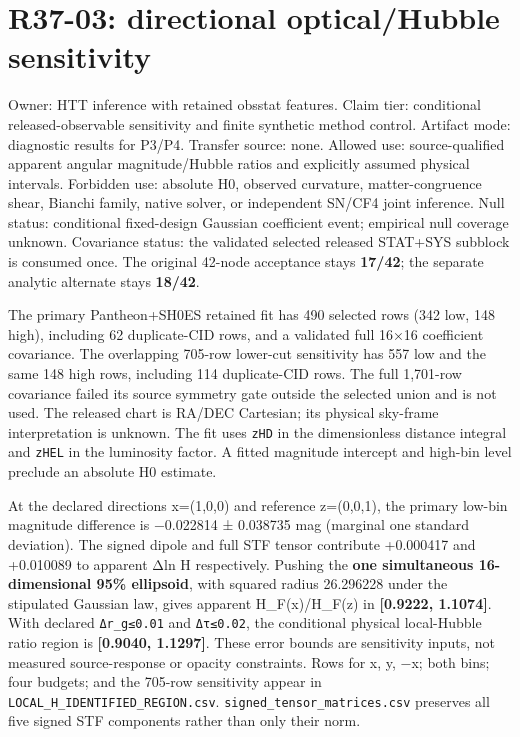 \documentclass[
]{article}
\author{}
\date{}
\begin{document}
\hypertarget{r37-03-directional-opticalhubble-sensitivity}{%
\section{R37-03: directional optical/Hubble
sensitivity}\label{r37-03-directional-opticalhubble-sensitivity}}

Owner: HTT inference with retained obsstat features. Claim tier:
conditional released-observable sensitivity and finite synthetic method
control. Artifact mode: diagnostic results for P3/P4. Transfer source:
none. Allowed use: source-qualified apparent angular magnitude/Hubble
ratios and explicitly assumed physical intervals. Forbidden use:
absolute H0, observed curvature, matter-congruence shear, Bianchi
family, native solver, or independent SN/CF4 joint inference. Null
status: conditional fixed-design Gaussian coefficient event; empirical
null coverage unknown. Covariance status: the validated selected
released STAT+SYS subblock is consumed once. The original 42-node
acceptance stays \textbf{17/42}; the separate analytic alternate stays
\textbf{18/42}.

The primary Pantheon+SH0ES retained fit has 490 selected rows (342 low,
148 high), including 62 duplicate-CID rows, and a validated full 16×16
coefficient covariance. The overlapping 705-row lower-cut sensitivity
has 557 low and the same 148 high rows, including 114 duplicate-CID
rows. The full 1,701-row covariance failed its source symmetry gate
outside the selected union and is not used. The released chart is RA/DEC
Cartesian; its physical sky-frame interpretation is unknown. The fit
uses \texttt{zHD} in the dimensionless distance integral and
\texttt{zHEL} in the luminosity factor. A fitted magnitude intercept and
high-bin level preclude an absolute H0 estimate.

At the declared directions x=(1,0,0) and reference z=(0,0,1), the
primary low-bin magnitude difference is −0.022814 ± 0.038735 mag
(marginal one standard deviation). The signed dipole and full STF tensor
contribute +0.000417 and +0.010089 to apparent Δln H respectively.
Pushing the \textbf{one simultaneous 16-dimensional 95\% ellipsoid},
with squared radius 26.296228 under the stipulated Gaussian law, gives
apparent H\_F(x)/H\_F(z) in \textbf{{[}0.9222, 1.1074{]}}. With declared
\texttt{\textbar{}Δr\_g\textbar{}≤0.01} and
\texttt{\textbar{}Δτ\textbar{}≤0.02}, the conditional physical
local-Hubble ratio region is \textbf{{[}0.9040, 1.1297{]}}. These error
bounds are sensitivity inputs, not measured source-response or opacity
constraints. Rows for x, y, −x; both bins; four budgets; and the 705-row
sensitivity appear in \texttt{LOCAL\_H\_IDENTIFIED\_REGION.csv}.
\texttt{signed\_tensor\_matrices.csv} preserves all five signed STF
components rather than only their norm.
\end{document}
